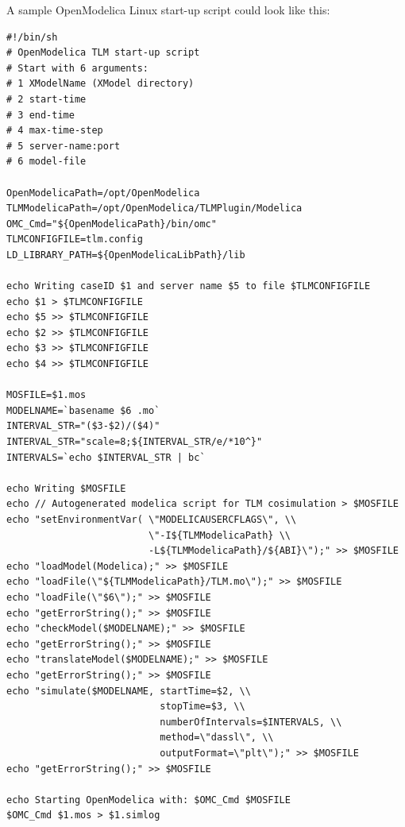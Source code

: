 A sample OpenModelica Linux start-up script could look like this:
{\scriptsize
\begin{verbatim}
#!/bin/sh
# OpenModelica TLM start-up script
# Start with 6 arguments:
# 1 XModelName (XModel directory)
# 2 start-time
# 3 end-time
# 4 max-time-step
# 5 server-name:port
# 6 model-file

OpenModelicaPath=/opt/OpenModelica
TLMModelicaPath=/opt/OpenModelica/TLMPlugin/Modelica
OMC_Cmd="${OpenModelicaPath}/bin/omc"
TLMCONFIGFILE=tlm.config
LD_LIBRARY_PATH=${OpenModelicaLibPath}/lib

echo Writing caseID $1 and server name $5 to file $TLMCONFIGFILE
echo $1 > $TLMCONFIGFILE
echo $5 >> $TLMCONFIGFILE
echo $2 >> $TLMCONFIGFILE
echo $3 >> $TLMCONFIGFILE
echo $4 >> $TLMCONFIGFILE

MOSFILE=$1.mos
MODELNAME=`basename $6 .mo`
INTERVAL_STR="($3-$2)/($4)"
INTERVAL_STR="scale=8;${INTERVAL_STR/e/*10^}"
INTERVALS=`echo $INTERVAL_STR | bc`

echo Writing $MOSFILE
echo // Autogenerated modelica script for TLM cosimulation > $MOSFILE
echo "setEnvironmentVar( \"MODELICAUSERCFLAGS\", \\
                         \"-I${TLMModelicaPath} \\
                         -L${TLMModelicaPath}/${ABI}\");" >> $MOSFILE
echo "loadModel(Modelica);" >> $MOSFILE
echo "loadFile(\"${TLMModelicaPath}/TLM.mo\");" >> $MOSFILE
echo "loadFile(\"$6\");" >> $MOSFILE
echo "getErrorString();" >> $MOSFILE
echo "checkModel($MODELNAME);" >> $MOSFILE
echo "getErrorString();" >> $MOSFILE
echo "translateModel($MODELNAME);" >> $MOSFILE
echo "getErrorString();" >> $MOSFILE
echo "simulate($MODELNAME, startTime=$2, \\
                           stopTime=$3, \\
                           numberOfIntervals=$INTERVALS, \\
                           method=\"dassl\", \\
                           outputFormat=\"plt\");" >> $MOSFILE
echo "getErrorString();" >> $MOSFILE

echo Starting OpenModelica with: $OMC_Cmd $MOSFILE
$OMC_Cmd $1.mos > $1.simlog

\end{verbatim}
}

